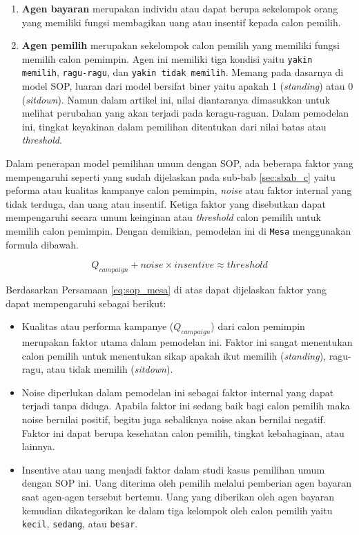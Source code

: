 \begin{enumerate}
\item \textbf{Agen bayaran} merupakan individu atau dapat berupa sekelompok orang yang memiliki fungsi membagikan uang atau insentif kepada calon pemilih.

\item \textbf{Agen pemilih} merupakan sekelompok calon pemilih yang memiliki fungsi memilih calon pemimpin. Agen ini memiliki tiga kondisi yaitu \texttt{yakin memilih}, \texttt{ragu-ragu}, dan \texttt{yakin tidak memilih}. Memang pada dasarnya di model SOP, luaran dari model bersifat biner yaitu apakah 1 (\textit{standing}) atau 0 (\textit{sitdown}). Namun dalam artikel ini, nilai diantaranya dimasukkan untuk melihat perubahan yang akan terjadi pada keragu-raguan. Dalam pemodelan ini, tingkat keyakinan dalam pemilihan ditentukan dari nilai batas atau \textit{threshold}.
\end{enumerate}

Dalam penerapan model pemilihan umum dengan SOP, ada beberapa faktor yang mempengaruhi seperti yang sudah dijelaskan pada sub-bab \ref{sec:sbab_c} yaitu peforma atau kualitas kampanye calon pemimpin, \textit{noise} atau faktor internal yang tidak terduga, dan uang atau insentif. Ketiga faktor yang disebutkan dapat mempengaruhi secara umum keinginan atau \textit{threshold} calon pemilih untuk memilih calon pemimpin. Dengan demikian, pemodelan ini di \texttt{Mesa} menggunakan formula dibawah.

\begin{equation}
Q_{campaign} + noise \times insentive \approx threshold
\label{eq:sop_mesa}
\end{equation}

Berdasarkan Persamaan \ref{eq:sop_mesa} di atas dapat dijelaskan faktor yang dapat mempengaruhi sebagai berikut:

\begin{itemize}
\item Kualitas atau performa kampanye ($Q_{campaign}$) dari calon pemimpin merupakan faktor utama dalam pemodelan ini. Faktor ini sangat menentukan calon pemilih untuk menentukan sikap apakah ikut memilih (\textit{standing}), ragu-ragu, atau tidak memilih (\textit{sitdown}).

\item Noise diperlukan dalam pemodelan ini sebagai faktor internal yang dapat terjadi tanpa diduga. Apabila faktor ini sedang baik bagi calon pemilih maka noise bernilai positif, begitu juga sebaliknya noise akan bernilai negatif. Faktor ini dapat berupa kesehatan calon pemilih, tingkat kebahagiaan, atau lainnya.

\item Insentive atau uang menjadi faktor dalam studi kasus pemilihan umum dengan SOP ini. Uang diterima oleh pemilih melalui pemberian agen bayaran saat agen-agen tersebut bertemu. Uang yang diberikan oleh agen bayaran kemudian dikategorikan ke dalam tiga kelompok oleh calon pemilih yaitu \texttt{kecil}, \texttt{sedang}, atau \texttt{besar}.
\end{itemize}
